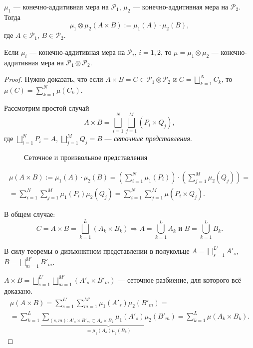 \begin{definition}
    $\mu_1$ — конечно-аддитивная мера на $\mathcal{P}_1$, $\mu_2$ — конечно-аддитивная мера на $\mathcal{P}_2$. Тогда
    \[\mu_1 \otimes \mu_2 (A \times B) := \mu_1(A) \cdot \mu_2(B),\]
    где $A \in \mathcal{P}_1$, $B \in \mathcal{P}_2$.
\end{definition} 

\begin{lemma}
    Если $\mu_i$ — конечно-аддитивная мера на $\mathcal{P}_i$, $i = 1, 2$, то $\mu = \mu_1 \otimes \mu_2$ — конечно-аддитивная мера на $\mathcal{P}_1 \otimes \mathcal{P}_2$.
\end{lemma} 
\begin{proof}
    Нужно доказать, что если $A \times B = C \in \mathcal{P}_1 \otimes \mathcal{P}_2$ и $C = \bigsqcup\limits_{k=1}^{N}C_k$, то $\mu(C) = \sum\limits_{k=1}^{N}\mu(C_k)$.
    
    Рассмотрим простой случай $$A \times B = \bigsqcup\limits_{i=1}^{N} \bigsqcup\limits_{j=1}^{M} (P_i \times Q_j),$$
    где $\bigsqcup\limits_{i=1}^{N}P_i = A$, $\bigsqcup\limits_{j=1}^{M}Q_j = B$ — \textit{сеточные представления}.
    
    \begin{figure}[H]
        \centering
        \caption{Сеточное и произвольное представления}
        \label{fig:2}
    \end{figure}

    \begin{multline*}
        \mu(A \times B) := \mu_1(A) \cdot \mu_2(B) = \left(\sum\limits_{i=1}^{N}\mu_1(P_i)\right) \cdot \left(\sum\limits_{j=1}^{M}\mu_2(Q_j)\right) =\\= \sum\limits_{i=1}^{N} \sum\limits_{j=1}^{M} \mu_1(P_i) \mu_2(Q_j) = \sum\limits_{i=1}^{N} \sum\limits_{j=1}^{M} \mu(P_i \times Q_j).
    \end{multline*}

    В общем случае:
    \[C = A \times B = \bigsqcup\limits_{k=1}^{L} (A_k \times B_k) \Longrightarrow A = \bigcup\limits_{k=1}^{L} A_k \text{ и } B = \bigcup\limits_{k=1}^{L} B_k.\]

    В силу теоремы о дизъюнктном представлении в полукольце $A = \bigsqcup\limits_{s=1}^{L'} A'_s$, $B = \bigsqcup\limits_{m=1}^{M'} B'_m$.

    $A \times B = \bigsqcup\limits_{s=1}^{L'} \bigsqcup\limits_{m=1}^{M'} (A'_s \times B'_m)$ — сеточное разбиение, для которого всё доказано.
    \begin{multline*}
        \mu(A \times B) = \sum\limits_{s=1}^{L'} \sum\limits_{m=1}^{M'} \mu_1 (A'_s) \mu_2(B'_m) =\\= \sum\limits_{k=1}^{L} \underbrace{\sum\limits_{(s,m): A'_s \times B'_m \subset A_k \times B_k} \mu_1(A'_s) \mu_2(B'_m)}_{= \mu_1(A_k) \mu_2(B_k)} = \sum\limits_{k=1}^{L} \mu(A_k \times B_k).
    \end{multline*}
\end{proof} 


